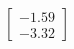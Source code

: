 \documentclass[preview]{standalone}
\begin{document}
\begin{align*}
\begin{bmatrix} -1.59 \\ -3.32 \end{bmatrix}
\end{align*}
\end{document}
